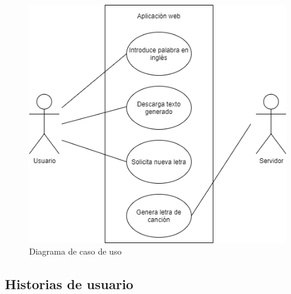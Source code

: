\documentclass[12pt, a4paper, titlepage]{report}
\begin{document}
		\begin{figure}[H] 
			\includegraphics[scale=.75]{./imagenes/Disenio/Arquitectura/CasoUso.png}
			\centering 
			\caption{Diagrama de caso de uso}
		\end{figure}
	\newpage
		\subsection{Historias de usuario}
		
\end{document}
